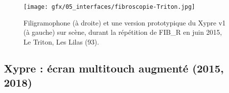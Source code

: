 \begin{figure}[!htbp]
	\captionsetup{format=plain}%
	\texttt{[image: gfx/05\_interfaces/fibroscopie-Triton.jpg]}
	\caption[Filigramophone et prototype du Xypre sur scène]{Filigramophone (à droite) et une version prototypique du Xypre v1 (à gauche) sur scène, durant la répétition de FIB\_R en juin 2015, Le Triton, Les Lilas (93).}
	\label{fig:interface:filigramophone-Xypre-Triton}
\end{figure}


\subsection{Xypre : écran multitouch augmenté (2015, 2018)}
\label{sec:interfaces:phylogenese:xypre}
